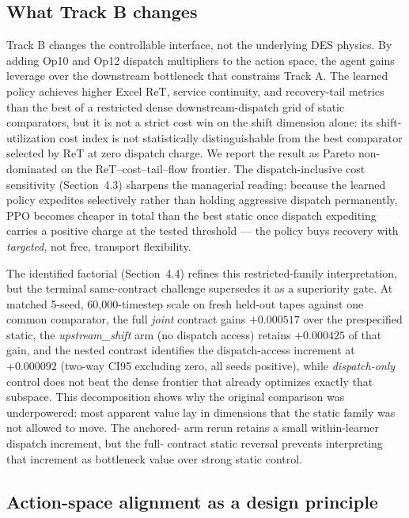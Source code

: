 \hypertarget{52-what-track-b-changes}{%
\subsection{What Track B changes}\label{52-what-track-b-changes}}

Track B changes the controllable interface, not the underlying DES physics.
By adding Op10 and Op12 dispatch multipliers to the action space, the agent
gains leverage over the downstream bottleneck that constrains Track A. The
learned policy achieves higher Excel ReT, service continuity, and
recovery-tail metrics than the best of a restricted dense downstream-dispatch grid of static comparators,
but it is not a strict cost win on the shift dimension alone: its
shift-utilization cost index is not statistically distinguishable from
the best comparator selected by ReT at zero dispatch charge. We report
the result as Pareto non-dominated on the ReT--cost--tail--flow frontier. The
dispatch-inclusive cost sensitivity (Section~4.3) sharpens the managerial
reading: because the learned policy expedites selectively rather than
holding aggressive dispatch permanently, PPO becomes cheaper in total than
the best static once dispatch expediting carries a positive charge at the
tested threshold --- the policy buys recovery with \emph{targeted}, not free,
transport flexibility.

The identified factorial (Section~4.4) refines this restricted-family
interpretation, but the terminal same-contract challenge supersedes it as a
superiority gate. At matched 5-seed, 60{,}000-timestep scale on fresh
held-out tapes against one common comparator, the full \emph{joint}
contract gains $+0.000517$ over the prespecified static, the
\emph{upstream\_shift} arm (no dispatch access) retains $+0.000425$ of
that gain, and the nested contrast identifies the dispatch-access
increment at $+0.000092$ (two-way CI95 excluding zero, all seeds
positive), while \emph{dispatch-only} control does not beat the dense
frontier that already optimizes exactly that subspace. This decomposition
shows why the original comparison was underpowered: most apparent value lay
in dimensions that the static family was not allowed to move. The anchored-
arm rerun retains a small within-learner dispatch increment, but the full-
contract static reversal prevents interpreting that increment as bottleneck
value over strong static control.

\hypertarget{53-action-space-alignment}{%
\subsection{Action-space alignment as a design principle}\label{53-action-space-alignment}}

